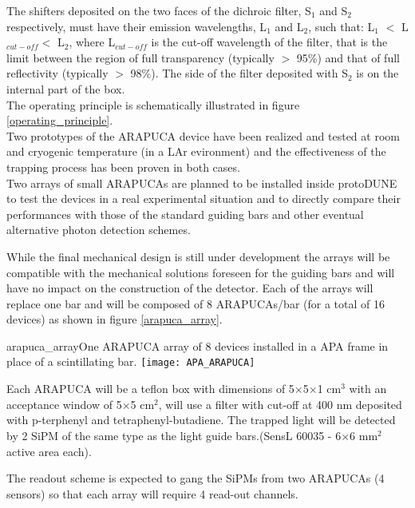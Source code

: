 The shifters deposited on the two faces of the dichroic filter, S$_1$ and S$_2$ respectively, must have their emission wavelengths, L$_1$ and L$_2$, such that:  
L$_1$ $<$ L$_{cut-off}$$ <$ L$_2$, where L$_{cut-off}$ is the cut-off wavelength of the filter, that is the limit between the region of full transparency (typically $>$ 95\%) and that of full
 reflectivity (typically $>$ 98\%). The side of the filter deposited with S$_2$ is on the internal part of the box.\\
 The operating principle is schematically illustrated in figure \ref{operating_principle}.\\
 
 Two prototypes of the ARAPUCA device have been realized and tested at room and cryogenic temperature (in a LAr evironment) and the effectiveness of the trapping process has been 
 proven in both cases.\\

Two arrays of small ARAPUCAs are planned to be installed inside protoDUNE to test the devices in a real experimental situation and to directly compare their performances with those of the standard guiding bars and other eventual alternative photon detection schemes.\

While the final mechanical design is still under development the arrays will be compatible with the mechanical solutions foreseen for the guiding bars and will have no impact on the construction of the detector. Each of the arrays will replace one bar and will be composed of 8 ARAPUCAs/bar (for a total of 16 devices)  as shown in figure \ref{arapuca_array}.
\begin{cdrfigure}{arapuca_array}{One ARAPUCA array of 8 devices installed in a APA frame in place of a scintillating bar.}
\texttt{[image: APA\_ARAPUCA]}
\end{cdrfigure}

Each ARAPUCA will be a teflon box with dimensions of 5$\times$5$\times$1 cm$^3$ with an acceptance window of 5$\times$5 
cm$^2$, will use a filter with cut-off at 400 nm deposited with p-terphenyl and tetraphenyl-butadiene. The trapped light will be detected by 2 SiPM of the same type as the light guide bars.(SensL 60035 - 6$\times$6 mm$^2$ 
active area each).

The readout scheme is expected to gang the SiPMs from two ARAPUCAs (4 sensors) so that each array will require 4 read-out channels. 


